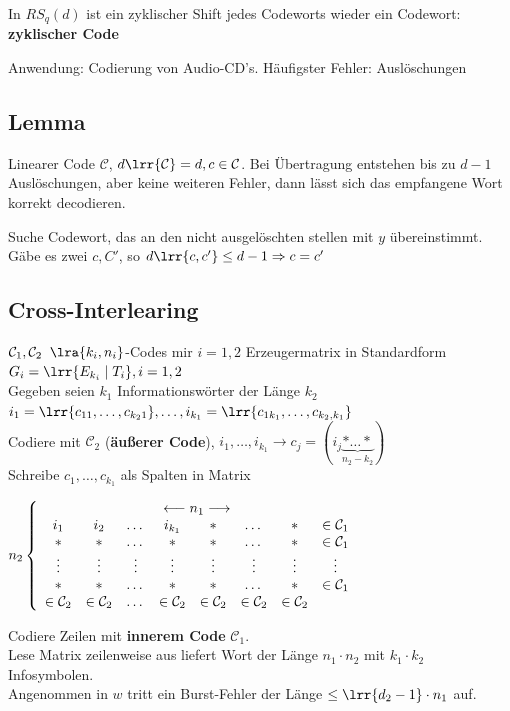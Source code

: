				In $RS_q(d)$ ist ein zyklischer Shift jedes Codeworts wieder ein Codewort: \textbf{zyklischer Code}
			
				Anwendung: Codierung von Audio-CD's. Häufigster Fehler: Auslöschungen
		\subExEnd
	
	\subsection{Lemma}
		Linearer Code $\mathcal{C}$, $d\lrr{\mathcal{C}}=d, c\in\mathcal{C}$. Bei Übertragung entstehen bis zu $d-1$ Auslöschungen, aber keine weiteren Fehler, dann lässt sich das empfangene Wort korrekt decodieren.
	
		Suche Codewort, das an den nicht ausgelöschten stellen mit $y$ übereinstimmt.\\
		Gäbe es zwei $c,C'$, so $d\lrr{c,c'}\leq d-1\Rightarrow c=c'$
	
	\subsection{Cross-Interlearing}
		$\mathcal{C}_1, \mathcal{C}_2\;\; \lra{k_i,n_i}$-Codes mir $i=1,2$ Erzeugermatrix in Standardform $G_i=\lrr{E_{k_i}\mid T_i}, i=1,2$\\
		Gegeben seien $k_1$ Informationswörter der Länge $k_2$\\
		$i_1=\lrr{c_{11},\dots,c_{k_21}},\dots,i_{k_1}=\lrr{c_{1k_1},\dots,c_{k_2,k_1}}$\\
		Codiere mit $\mathcal{C}_2$ (\textbf{äußerer Code}), $i_1,\dots,i_{k_1}\rightarrow c_j=(i_j\underbrace{*\dots*}_{n_2-k_2})$\\
		Schreibe $c_1,\dots,c_{k_1}$ als Spalten in Matrix
	
		$n_2\left\lbrace\begin{array}{cccccccc}
			\multicolumn{8}{c}{\longleftarrow n_1 \longrightarrow}\\
			i_1&i_2&\dots&i_{k_1}&*&\dots&*&\in\mathcal{C}_1\\
			*&*&\dots&*&*&\dots&*&\in\mathcal{C}_1\\
			\vdots&\vdots&\vdots&\vdots&\vdots&\vdots&\vdots&\vdots\\
			*&*&\dots&*&*&\dots&*&\in\mathcal{C}_1\\
			\in\mathcal{C}_2&\in\mathcal{C}_2&\dots&\in\mathcal{C}_2&\in\mathcal{C}_2&\in\mathcal{C}_2&\in\mathcal{C}_2&
		\end{array}\right.$
	
		Codiere Zeilen mit \textbf{innerem Code} $\mathcal{C}_1$.\\
		Lese Matrix zeilenweise aus liefert Wort der Länge $n_1\cdot n_2$ mit $k_1\cdot k_2$ Infosymbolen.\\
		Angenommen in $w$ tritt ein Burst-Fehler der Länge $\leq\lrr{d_2-1}\cdot n_1$ auf.
	
